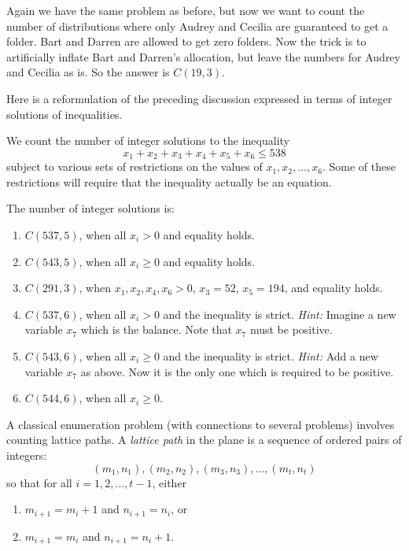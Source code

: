\begin{example}
  Again we have the same problem as before, but now we want to count
  the number of distributions where only Audrey and Cecilia are
  guaranteed to get a folder. Bart and Darren are allowed to get zero
  folders.  Now the trick is to artificially inflate Bart and Darren's
  allocation, but leave the numbers for Audrey and Cecilia as is.  So
  the answer is $C(19,3)$.
\end{example}

\begin{example}
Here is a reformulation of the preceding discussion expressed in terms
of integer solutions of inequalities.

We count the number of integer solutions to the inequality
\[
x_1+x_2+x_3+x_4+x_5+x_6\le 538
\]
subject to various sets of restrictions on the values of
$x_1,x_2,\dots,x_6$.  Some of these restrictions will require
that the inequality actually be an equation.
 
The number of integer solutions is:

\begin{enumerate}
\item $C(537,5)$, when all $x_i> 0$ and equality holds.
\item $C(543,5)$, when all $x_i\ge 0$ and equality holds.
\item $C(291,3)$, when $x_1,x_2,x_4,x_6>0$, $x_3=52$,
$x_5=194$, and equality holds.
\item $C(537,6)$, when all $x_i > 0$ and the inequality is
strict. \textit{Hint:} Imagine a new variable $x_7$ which is
the balance.  Note that $x_7$ must be positive.
\item $C(543,6)$, when all $x_i \ge 0$ and the inequality is
strict. \textit{Hint:} Add a new variable $x_7$ as above.   Now it
is the only one which is required to be positive.
\item $C(544,6)$, when all $x_i \ge 0$.
\end{enumerate}
\end{example}

A classical enumeration problem (with connections to several problems)
involves counting lattice paths. A \textit{lattice path} in the plane
is a sequence of ordered pairs of integers:
\[
(m_1,n_1), (m_2,n_2), (m_3,n_3),\dots,(m_t,n_t)
\]
so that for all $i=1,2,\dots,t-1$, either
\begin{enumerate}
\item  $m_{i+1}=m_{i}+1$ and $n_{i+1}=n_i$, or
\item  $m_{i+1}=m_i$ and $n_{i+1}=n_{i}+1$.
\end{enumerate}

